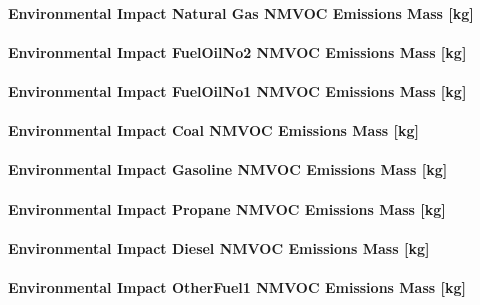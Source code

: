 \paragraph{Environmental Impact Natural Gas NMVOC Emissions Mass {[}kg{]}}\label{environmental-impact-natural-gas-nmvoc-emissions-mass-kg}

\paragraph{Environmental Impact FuelOilNo2 NMVOC Emissions Mass {[}kg{]}}\label{environmental-impact-fuel-oil-2-nmvoc-emissions-mass-kg}

\paragraph{Environmental Impact FuelOilNo1 NMVOC Emissions Mass {[}kg{]}}\label{environmental-impact-fuel-oil-1-nmvoc-emissions-mass-kg}

\paragraph{Environmental Impact Coal NMVOC Emissions Mass {[}kg{]}}\label{environmental-impact-coal-nmvoc-emissions-mass-kg}

\paragraph{Environmental Impact Gasoline NMVOC Emissions Mass {[}kg{]}}\label{environmental-impact-gasoline-nmvoc-emissions-mass-kg}

\paragraph{Environmental Impact Propane NMVOC Emissions Mass {[}kg{]}}\label{environmental-impact-propane-nmvoc-emissions-mass-kg}

\paragraph{Environmental Impact Diesel NMVOC Emissions Mass {[}kg{]}}\label{environmental-impact-diesel-nmvoc-emissions-mass-kg}

\paragraph{Environmental Impact OtherFuel1 NMVOC Emissions Mass {[}kg{]}}\label{environmental-impact-otherfuel1-nmvoc-emissions-mass-kg}


